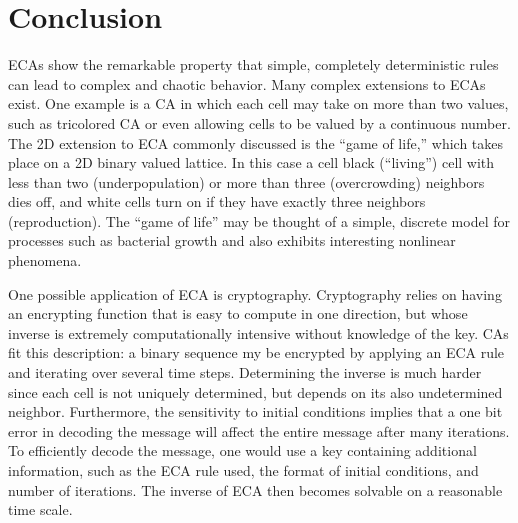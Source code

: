 \section{Conclusion}

ECAs show the remarkable property that simple, completely deterministic rules can lead to complex and chaotic behavior.  Many complex extensions to ECAs exist.  One example is a CA in which each cell may take on more than two values, such as tricolored CA or even allowing cells to be valued by a continuous number.  The 2D extension to ECA commonly discussed is the “game of life,” which takes place on a 2D binary valued lattice.  In this case a cell black (“living”) cell with less than two (underpopulation) or more than three (overcrowding) neighbors dies off, and white cells turn on if they have exactly three neighbors (reproduction).  The “game of life” may be thought of a simple, discrete model for processes such as bacterial growth and also exhibits interesting nonlinear phenomena.  

One possible application of ECA is cryptography.  Cryptography relies on having an encrypting function that is easy to compute in one direction, but whose inverse is extremely computationally intensive without knowledge of the key.  CAs fit this description: a binary sequence my be encrypted by applying an ECA rule and iterating over several time steps.  Determining the inverse is much harder since each cell is not uniquely determined, but depends on its also undetermined neighbor.  Furthermore, the sensitivity to initial conditions implies that a one bit error in decoding the message will affect the entire message after many iterations.  To efficiently decode the message, one would use a key containing additional information, such as the ECA rule used, the format of initial conditions, and number of iterations.  The inverse of ECA then becomes solvable on a reasonable time scale.  

